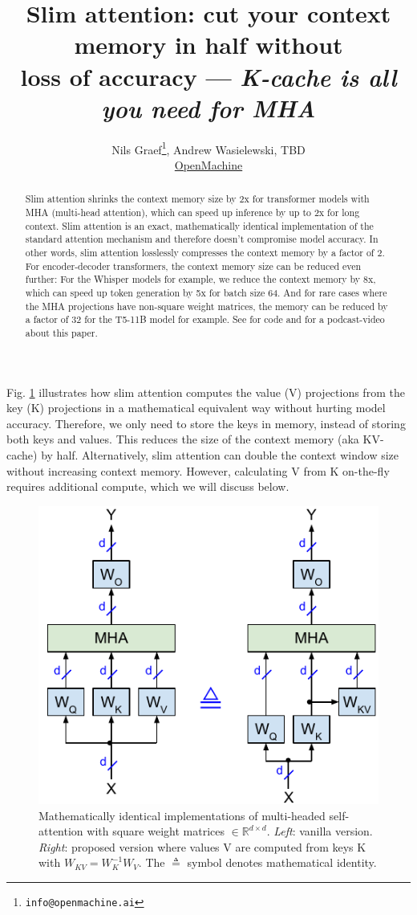 \documentclass{article}
\title{Slim attention: cut your context memory in half without \\ loss of accuracy --- \emph{K-cache is all you need for MHA}}
\author{Nils Graef\thanks{\texttt{info@openmachine.ai}}, Andrew Wasielewski, TBD \\
  \href{https://openmachine.ai}{OpenMachine}}
\newcommand{\eR}[2]{$\in \mathbb{R}^{#1 \times #2}$} %
\begin{document}
 \maketitle

\begin{abstract}
Slim attention shrinks the context memory size by 2x for transformer models with MHA (multi-head attention), which can speed up inference by up to 2x for long context. Slim attention is an exact, mathematically identical implementation of the standard attention mechanism and therefore doesn’t compromise model accuracy. In other words, slim attention losslessly compresses the context memory by a factor of 2. For encoder-decoder transformers, the context memory size can be reduced even further: For the Whisper models for example, we reduce the context memory by 8x, which can speed up token generation by 5x for batch size 64. And for rare cases where the MHA projections have non-square weight matrices, the memory can be reduced by a factor of 32 for the T5-11B model for example. See \citep{tricks} for code and \citep{slim-video} for a podcast-video about this paper.
\end{abstract}

Fig. \ref{fig1} illustrates how slim attention computes the value (V) projections from the key (K) projections in a mathematical equivalent way without hurting model accuracy. Therefore, we only need to store the keys in memory, instead of storing both keys and values. This reduces the size of the context memory (aka KV-cache) by half. Alternatively, slim attention can double the context window size without increasing context memory. However, calculating V from K on-the-fly requires additional compute, which we will discuss below.
\begin{figure}[h!] \centering  %
  \includegraphics[scale=0.9]{../doc/fig/slimAttn_fig1.pdf}
  \caption{Mathematically identical implementations of multi-headed self-attention with square weight matrices \eR{d}{d}. \emph{Left}: vanilla version. \emph{Right}: proposed version where values V are computed from keys K with $W_{KV} = W_K^{-1} W_V$. The $\triangleq$ symbol denotes mathematical identity.}
\label{fig1} \end{figure}
\end{document}
